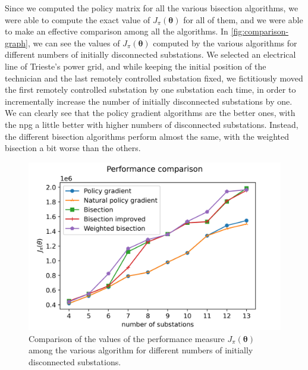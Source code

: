 Since we computed the policy matrix for all the various bisection algorithms, we were able to compute the exact value of $J_\pi (\boldsymbol \theta)$ for all of them, and we were able to make an effective comparison among all the algorithms. In \autoref{fig:comparison-graph}, we can see the values of $J_\pi(\boldsymbol \theta)$ computed by the various algorithms for different numbers of initially disconnected substations. We selected an electrical line of Trieste's power grid, and while keeping the initial position of the technician and the last remotely controlled substation fixed, we fictitiously moved the first remotely controlled substation by one substation each time, in order to incrementally increase the number of initially disconnected substations by one.
We can clearly see that the policy gradient algorithms are the better ones, with the \acrshort{npg} a little better with higher numbers of disconnected substations. Instead, the different bisection algorithms perform almost the same, with the weighted bisection a bit worse than the others.

\begin{figure}[bh]
    \centering
    \includegraphics[scale=0.8]{chapters/figures/comparison_graph.png}
    \caption{Comparison of the values of the performance measure $J_\pi (\boldsymbol \theta)$ among the various algorithm for different numbers of initially disconnected substations.}
    \label{fig:comparison-graph}
\end{figure}


